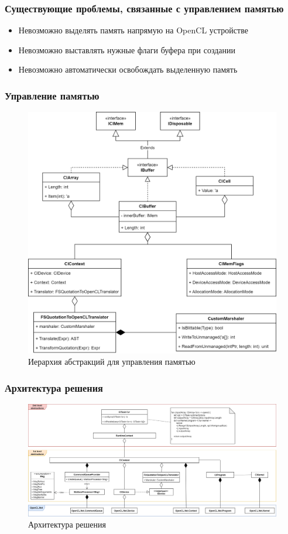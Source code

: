 \documentclass[aspectratio=169]{beamer}
\begin{document}
\begin{frame}  
  \frametitle{Существующие проблемы, связанные с управлением памятью}
    \begin{itemize}
    \item Невозможно выделять память напрямую на OpenCL устройстве
    \item Невозможно выставлять нужные флаги буфера при создании
    \item Невозможно автоматически освобождать выделенную память
\end{itemize}
\end{frame}
             
\begin{frame}
    \frametitle{Управление памятью}
    \begin{figure}
\centering
\includegraphics[scale=0.13]{pictures/Mem.drawio (1).png}
\caption{Иерархия абстракций для управления памятью}
\label{fig:mem}
\end{figure}
\end{frame}
           
\begin{frame}
    \frametitle{Архитектура решения}
    \begin{figure}
\centering
\includegraphics[scale=0.14]{pictures/small.drawio (2).png}
\caption{Архитектура решения}
\label{fig:mem}
\end{figure}
\end{frame}
           
\end{document}
